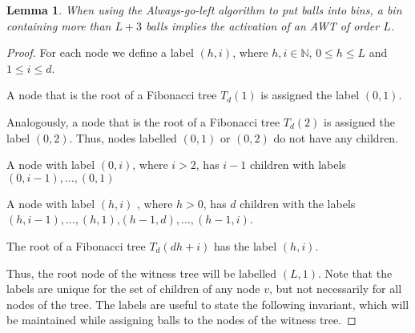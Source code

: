 \documentclass[a4paper,12pt]{article}
\newtheorem{lemma}{Lemma}
\begin{document}
\begin{lemma}
When using the Always-go-left algorithm to put balls into bins, a bin containing more than $L+3$ balls implies the activation of an AWT of order $L$.
\end{lemma}
\begin{proof}
For each node we define a label $(h, i)$, where $h, i \in \mathbb{N}$, $0 \leq h \leq L$ and  $1\leq i \leq d$. 
\begin{compactitem}
\item A node that is the root of a Fibonacci tree $T_d(1)$ is assigned the label $(0,1)$.
\item Analogously, a node that is the root of a Fibonacci tree $T_d(2)$ is assigned the label $(0,2)$. Thus, nodes labelled $(0,1)$ or $(0,2)$ do not have any children.
\item A node with label $(0, i)$, where $i>2$, has $i-1$ children with labels $(0,i-1),\dots,(0,1)$
\item A node with label $(h,i)$ , where $h>0$, has $d$ children with the labels $(h,i-1),\dots,(h,1)$,$(h-1,d),\dots,(h-1, i)$.
\item The root of a Fibonacci tree $T_d(d h+i)$ has the label $(h, i)$. 
\end{compactitem}
Thus, the root node of the witness tree will be labelled $(L, 1)$. Note that the labels are unique for the set of children of any node $v$, but not necessarily for all nodes of the tree. The labels are useful to state the following invariant, which will be maintained while assigning balls to the nodes of the witness tree.


\end{proof}
\end{document}
